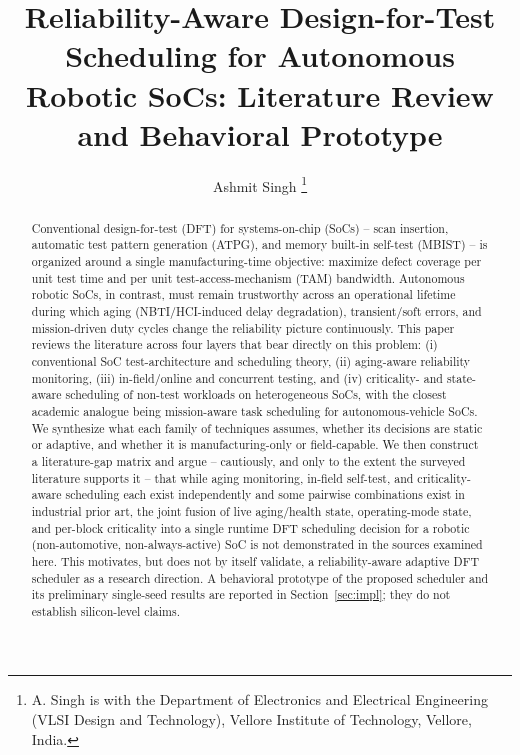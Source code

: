 \documentclass[journal]{IEEEtran}
\begin{document}
\title{Reliability-Aware Design-for-Test Scheduling for Autonomous Robotic SoCs: Literature Review and Behavioral Prototype}
\author{Ashmit Singh%
\thanks{A. Singh is with the Department of Electronics and Electrical Engineering (VLSI Design and Technology), Vellore Institute of Technology, Vellore, India.}}
\maketitle

\begin{abstract}
Conventional design-for-test (DFT) for systems-on-chip (SoCs) -- scan insertion, automatic test pattern generation (ATPG), and memory built-in self-test (MBIST) -- is organized around a single manufacturing-time objective: maximize defect coverage per unit test time and per unit test-access-mechanism (TAM) bandwidth. Autonomous robotic SoCs, in contrast, must remain trustworthy across an operational lifetime during which aging (NBTI/HCI-induced delay degradation), transient/soft errors, and mission-driven duty cycles change the reliability picture continuously. This paper reviews the literature across four layers that bear directly on this problem: (i) conventional SoC test-architecture and scheduling theory, (ii) aging-aware reliability monitoring, (iii) in-field/online and concurrent testing, and (iv) criticality- and state-aware scheduling of non-test workloads on heterogeneous SoCs, with the closest academic analogue being mission-aware task scheduling for autonomous-vehicle SoCs. We synthesize what each family of techniques assumes, whether its decisions are static or adaptive, and whether it is manufacturing-only or field-capable. We then construct a literature-gap matrix and argue -- cautiously, and only to the extent the surveyed literature supports it -- that while aging monitoring, in-field self-test, and criticality-aware scheduling each exist independently and some pairwise combinations exist in industrial prior art, the joint fusion of live aging/health state, operating-mode state, and per-block criticality into a single runtime DFT scheduling decision for a robotic (non-automotive, non-always-active) SoC is not demonstrated in the sources examined here. This motivates, but does not by itself validate, a reliability-aware adaptive DFT scheduler as a research direction. A behavioral prototype of the proposed scheduler and its preliminary single-seed results are reported in Section~\ref{sec:impl}; they do not establish silicon-level claims.
\end{abstract}
\end{document}
